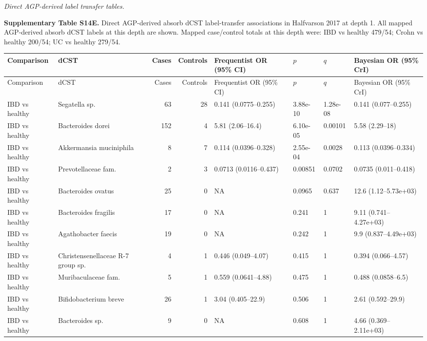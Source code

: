 \noindent\textit{Direct AGP-derived label transfer tables.}

\noindent\textbf{Supplementary Table S14E.} Direct AGP-derived absorb dCST label-transfer associations in Halfvarson 2017 at depth 1. All mapped AGP-derived absorb dCST labels at this depth are shown. Mapped case/control totals at this depth were: IBD vs healthy 479/54; Crohn vs healthy 200/54; UC vs healthy 279/54.

\begingroup
\scriptsize
\setlength{\tabcolsep}{3pt}
\setlength{\LTleft}{0pt}
\setlength{\LTright}{0pt}
\begin{longtable}{@{} p{} p{} r r p{} p{} p{} p{} @{}}
\toprule
Comparison & dCST & Cases & Controls & Frequentist OR (95\% CI) & \(p\) & \(q\) & Bayesian OR (95\% CrI) \\
\midrule
\endfirsthead
\toprule
Comparison & dCST & Cases & Controls & Frequentist OR (95\% CI) & \(p\) & \(q\) & Bayesian OR (95\% CrI) \\
\midrule
\endhead
\bottomrule
\endfoot
IBD vs healthy & Segatella sp. & 63 & 28 & 0.141 (0.0775--0.255) & 3.88e-10 & 1.28e-08 & 0.141 (0.077--0.255) \\
IBD vs healthy & Bacteroides dorei & 152 & 4 & 5.81 (2.06--16.4) & 6.10e-05 & 0.00101 & 5.58 (2.29--18) \\
IBD vs healthy & Akkermansia muciniphila & 8 & 7 & 0.114 (0.0396--0.328) & 2.55e-04 & 0.0028 & 0.113 (0.0396--0.334) \\
IBD vs healthy & Prevotellaceae fam. & 2 & 3 & 0.0713 (0.0116--0.437) & 0.00851 & 0.0702 & 0.0735 (0.011--0.418) \\
IBD vs healthy & Bacteroides ovatus & 25 & 0 & NA & 0.0965 & 0.637 & 12.6 (1.12--5.73e+03) \\
IBD vs healthy & Bacteroides fragilis & 17 & 0 & NA & 0.241 & 1 & 9.11 (0.741--4.27e+03) \\
IBD vs healthy & Agathobacter faecis & 19 & 0 & NA & 0.242 & 1 & 9.9 (0.837--4.49e+03) \\
IBD vs healthy & Christensenellaceae R-7 group sp. & 4 & 1 & 0.446 (0.049--4.07) & 0.415 & 1 & 0.394 (0.066--4.57) \\
IBD vs healthy & Muribaculaceae fam. & 5 & 1 & 0.559 (0.0641--4.88) & 0.475 & 1 & 0.488 (0.0858--6.5) \\
IBD vs healthy & Bifidobacterium breve & 26 & 1 & 3.04 (0.405--22.9) & 0.506 & 1 & 2.61 (0.592--29.9) \\
IBD vs healthy & Bacteroides sp. & 9 & 0 & NA & 0.608 & 1 & 4.66 (0.369--2.11e+03) \\

\end{longtable}
